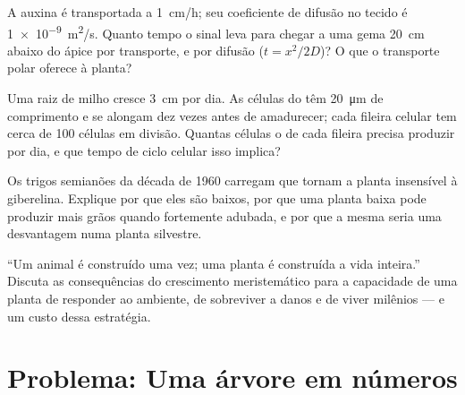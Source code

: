 \begin{exercise}[$\star\star$]\label{exo:b2:plant-meristems:9}
A auxina é transportada a \qty{1}{cm/h}; seu coeficiente de difusão no
tecido é \qty{1e-9}{m^2/s}. Quanto tempo o sinal leva para chegar a uma
gema \qty{20}{cm} abaixo do ápice por transporte, e por difusão
($t = x^2/2D$)? O que o transporte polar oferece à planta?
\end{exercise}

\begin{exercise}[$\star\star\star$]\label{exo:b2:plant-meristems:10}
Uma raiz de milho cresce \qty{3}{cm} por dia. As células do 
têm \qty{20}{\micro m} de comprimento e se alongam dez vezes antes de
amadurecer; cada fileira celular tem cerca de \num{100} células em
divisão. Quantas células o  de cada fileira precisa produzir
por dia, e que tempo de ciclo celular isso implica?
\end{exercise}

\begin{exercise}[$\star\star\star$]\label{exo:b2:plant-meristems:11}
Os trigos semianões da década de 1960 carregam  que tornam a
planta insensível à giberelina. Explique por que eles são baixos, por
que uma planta baixa pode produzir mais grãos quando fortemente
adubada, e por que a mesma  seria uma desvantagem numa planta
silvestre.
\end{exercise}

\begin{exercise}[$\star\star\star$]\label{exo:b2:plant-meristems:12}
``Um animal é construído uma vez; uma planta é construída a vida
inteira.'' Discuta as consequências do crescimento meristemático para a
capacidade de uma planta de responder ao ambiente, de sobreviver a
danos e de viver milênios --- e um custo dessa estratégia.
\end{exercise}

\section{Problema: Uma árvore em números}

